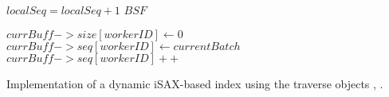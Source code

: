 {\begin{algorithm}[htbp]
\begin{algorithmic}[1]
                \State $\mathit{localSeq} = \mathit{localSeq} + 1$            
            \EndIf
        \EndWhile
        \State \Return $\mathit{BSF}$
    \EndProcedure
    
    \vspace*{1mm}
     \label{alg:BufferReuse}

        \State $\mathit{currBuff->size[workerID]} \gets 0$
            \State $\mathit{currBuff->seq[workerID]} \gets \mathit{currentBatch}$
        \EndIf
        \State $\mathit{currBuff->seq[workerID]++}$
    \EndProcedure
    
    \end{algorithmic}
    
    \caption{Implementation of a dynamic iSAX-based index using the traverse objects \BC, \TP.}
    \label{alg:DynamiciTraverseObject}
    \end{algorithm}
}